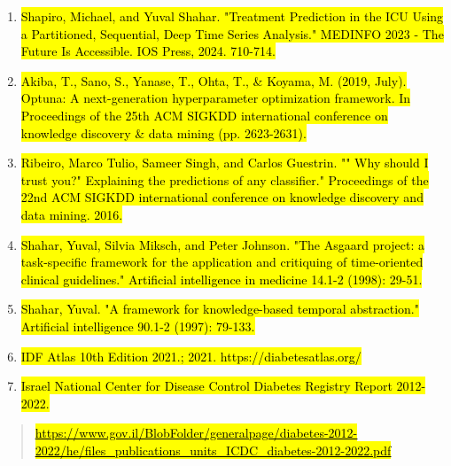 \documentclass[
]{article}
\begin{document}
\begin{enumerate}
{  Jaspreet Sahota, Sanjay Thakur, Stella Wu, Cathal Smyth, Pascal
  Poupart, Marcus Brubaker. "Time2vec: Learning a vector representation
  of time." arXiv preprint arXiv:1907.05321 (2019)‏}
\item
  \hl{Shapiro, Michael, and Yuval Shahar. "Treatment Prediction in the
  ICU Using a Partitioned, Sequential, Deep Time Series Analysis."
  MEDINFO 2023 - The Future Is Accessible. IOS Press, 2024. 710-714.}
\item
  \hl{Akiba, T., Sano, S., Yanase, T., Ohta, T., \& Koyama, M. (2019,
  July). Optuna: A next-generation hyperparameter optimization
  framework. In Proceedings of the 25th ACM SIGKDD international
  conference on knowledge discovery \& data mining (pp. 2623-2631).‏}
\item
  \hl{Ribeiro, Marco Tulio, Sameer Singh, and Carlos Guestrin. "" Why
  should I trust you?" Explaining the predictions of any classifier."
  Proceedings of the 22nd ACM SIGKDD international conference on
  knowledge discovery and data mining. 2016.}
\item
  \hl{Shahar, Yuval, Silvia Miksch, and Peter Johnson. "The Asgaard
  project: a task-specific framework for the application and critiquing
  of time-oriented clinical guidelines." Artificial intelligence in
  medicine 14.1-2 (1998): 29-51.‏}
\item
  \hl{Shahar, Yuval. "A framework for knowledge-based temporal
  abstraction." Artificial intelligence 90.1-2 (1997): 79-133.‏}
\item
  \hl{IDF Atlas 10th Edition 2021.; 2021. https://diabetesatlas.org/}
\item
  \hl{Israel National Center for Disease Control Diabetes Registry
  Report 2012-2022.}
\end{enumerate}

\begin{quote}
\href{https://www.gov.il/BlobFolder/generalpage/diabetes-2012-2022/he/files_publications_units_ICDC_diabetes-2012-2022.pdf}{\hl{\ul{https://www.gov.il/BlobFolder/generalpage/diabetes-2012-2022/he/files\_publications\_units\_ICDC\_diabetes-2012-2022.pdf}}}
\end{quote}
\end{document}
